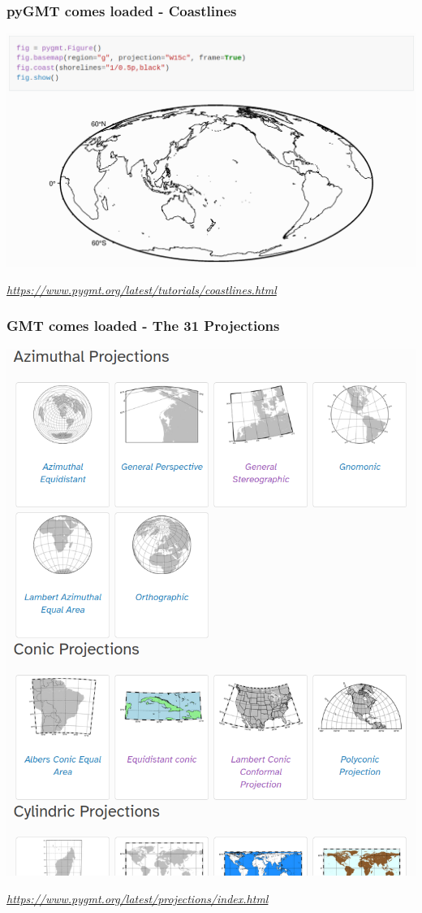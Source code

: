 \documentclass[unknownkeysallowed]{beamer}
\begin{document}
\begin{frame}
\frametitle{pyGMT comes loaded - Coastlines}
	\begin{center}
			\includegraphics[width=\textwidth]{../figures/pygmt_coastlines.png}	
	\end{center}
	\begin{flushright}
	\vspace{-0.35cm}
	\tiny{\emph{\url{https://www.pygmt.org/latest/tutorials/coastlines.html}}}
	\end{flushright}	

\end{frame}

\begin{frame}[fragile=singleslide]
\frametitle{GMT comes loaded - The 31 Projections}
	\begin{center}
			\includegraphics[width=.75\textwidth]{../figures/pygmt_projections.png}	
	\end{center}
	\begin{flushright}
	\vspace{-0.35cm}
	\tiny{\emph{\url{https://www.pygmt.org/latest/projections/index.html}}}
	\end{flushright}	

\end{frame}
\end{document}
